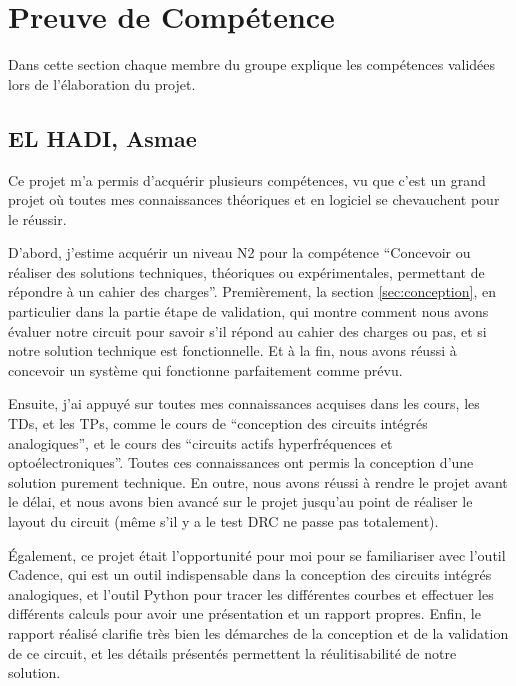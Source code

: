 \documentclass[a4paper,12pt]{article}
\newcommand{\aspas}[1]{``#1''}
\numberwithin{equation}{section}
\newcommand{\?}{\stackrel{?}{=}}
\begin{document}
\FloatBarrier
\newpage
\section{Preuve de Compétence}

Dans cette section chaque membre du groupe explique les compétences validées lors de l'élaboration du projet.

\subsection{EL HADI, Asmae}

Ce projet m'a permis d'acquérir plusieurs compétences, vu que c'est un grand projet où toutes mes connaissances théoriques et en logiciel se chevauchent pour le réussir. 

D'abord, j'estime acquérir un niveau N2 pour la compétence \aspas{Concevoir ou réaliser des solutions techniques, théoriques ou expérimentales, permettant de répondre à un cahier des charges}. Premièrement, la section \ref{sec:conception}, en particulier dans la partie étape de validation, qui montre comment nous avons évaluer notre circuit pour savoir s'il répond au cahier des charges ou pas, et si notre solution technique est fonctionnelle. Et à la fin, nous avons réussi à concevoir un système qui fonctionne parfaitement comme prévu.

Ensuite, j'ai appuyé sur toutes mes connaissances acquises dans les cours, les TDs, et les TPs, comme le cours de \aspas{conception des circuits intégrés analogiques}, et le cours des \aspas{circuits actifs hyperfréquences et optoélectroniques}. Toutes ces connaissances ont permis la conception d'une solution purement technique. En outre, nous avons réussi à rendre le projet avant le délai, et nous avons bien avancé sur le projet jusqu'au point de réaliser le layout du circuit (même s'il y a le test DRC ne passe pas totalement).

Également, ce projet était l'opportunité pour moi pour se familiariser avec l'outil Cadence, qui est un outil indispensable dans la conception des circuits intégrés analogiques, et l'outil Python pour tracer les différentes courbes et effectuer les différents calculs pour avoir une présentation et un rapport propres. Enfin, le rapport réalisé clarifie très bien les démarches de la conception et de la validation de ce circuit, et les détails présentés permettent la réulitisabilité de notre solution.
\end{document}
